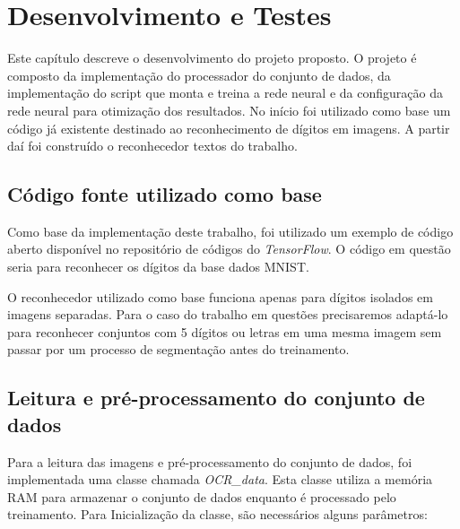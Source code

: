 \chapter{Desenvolvimento e Testes}

Este capítulo descreve o desenvolvimento do projeto proposto. O
projeto é composto da implementação do processador do conjunto de
dados, da implementação do script que monta e treina a rede neural e
da configuração da rede neural para otimização dos resultados. No
início foi utilizado como base um código já existente destinado ao
reconhecimento de dígitos em imagens. A partir daí foi construído o
reconhecedor textos do trabalho.

\section{Código fonte utilizado como base}

Como base da implementação deste trabalho, foi utilizado um exemplo
de código aberto disponível no repositório de códigos do
\textit{TensorFlow}\cite{mnistCode}. O código em questão seria para
reconhecer os dígitos da base dados MNIST\cite{mnist}.

O reconhecedor utilizado como base funciona apenas para dígitos
isolados em imagens separadas. Para o caso do trabalho em questões
precisaremos adaptá-lo para reconhecer conjuntos com 5 dígitos ou
letras em uma mesma imagem sem passar por um processo de segmentação
antes do treinamento.

\section{Leitura e pré-processamento do conjunto de dados}

Para a leitura das imagens e pré-processamento do conjunto de dados, foi
implementada uma classe chamada \textit{OCR\_data}. Esta classe utiliza
a memória RAM para armazenar o conjunto de dados enquanto é processado
pelo treinamento. Para Inicialização da classe, são necessários alguns
parâmetros:

